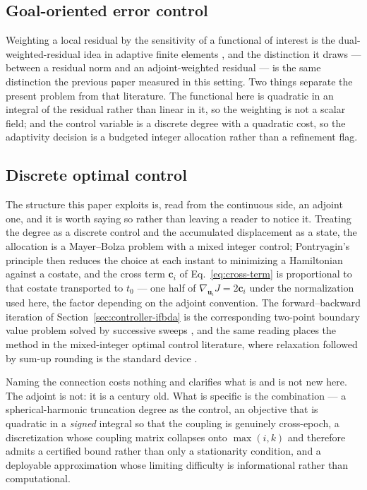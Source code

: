 \subsection{Goal-oriented error control}

Weighting a local residual by the sensitivity of a functional of interest is
the dual-weighted-residual idea in adaptive finite elements
\citep{becker2001optimal}, and the distinction it draws --- between a residual
norm and an adjoint-weighted residual --- is the same distinction the previous
paper measured in this setting. Two things separate the present problem from
that literature. The functional here is quadratic in an integral of the
residual rather than linear in it, so the weighting is not a scalar field;
and the control variable is a discrete degree with a quadratic cost, so the
adaptivity decision is a budgeted integer allocation rather than a refinement
flag.

\subsection{Discrete optimal control}

The structure this paper exploits is, read from the continuous side, an
adjoint one, and it is worth saying so rather than leaving a reader to notice
it. Treating the degree as a discrete control and the accumulated displacement
as a state, the allocation is a Mayer--Bolza problem with a mixed integer
control; Pontryagin's principle \citep{pontryagin1962mathematical} then
reduces the choice at each instant to minimizing a Hamiltonian against a
costate, and the cross term $\mathbf c_i$ of Eq.~\eqref{eq:cross-term} is
proportional to that costate transported to $t_0$ --- one half of
$\nabla_{\mathbf u_i}J=2\mathbf c_i$ under the normalization used here, the
factor depending on the adjoint convention. The forward--backward iteration of
Section~\ref{sec:controller-ifbda} is the corresponding two-point boundary
value problem solved by successive sweeps
\citep[Ch.~2]{bryson1975applied}, and the same reading places the method in
the mixed-integer optimal control literature, where relaxation followed by
sum-up rounding is the standard device \citep{sager2012integer}.

Naming the connection costs nothing and clarifies what is and is not new here.
The adjoint is not: it is a century old. What is specific is the combination
--- a spherical-harmonic truncation degree as the control, an objective that
is quadratic in a \emph{signed} integral so that the coupling is genuinely
cross-epoch, a discretization whose coupling matrix collapses onto
$\max(i,k)$ and therefore admits a certified bound rather than only a
stationarity condition, and a deployable approximation whose limiting
difficulty is informational rather than computational.

